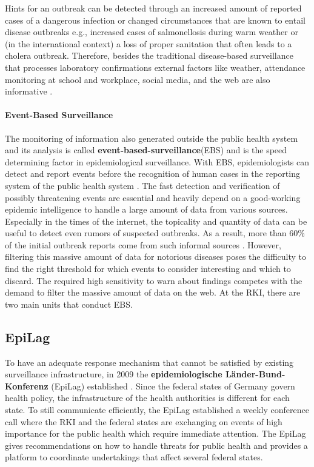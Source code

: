 Hints for an outbreak can be detected through an increased amount of reported cases of a dangerous infection or changed circumstances that are known to entail disease outbreaks e.g., increased cases of salmonellosis during warm weather or (in the international context) a loss of proper sanitation that often leads to a cholera outbreak.
Therefore, besides the traditional disease-based surveillance that processes laboratory confirmations external factors like weather, attendance monitoring at school and workplace, social media, and the web are also informative \citep{EarlyDetection}.

\paragraph{Event-Based Surveillance}
The monitoring of information also generated outside the public health system and its analysis is called \textbf{event-based-surveillance}(\gls{EBS}) and is the speed determining factor in epidemiological surveillance.
With EBS, epidemiologists can detect and report events before the recognition of human cases in the reporting system of the public health system \citep{EarlyDetection}.
The fast detection and verification of possibly threatening events are essential and heavily depend on a good-working epidemic intelligence to handle a large amount of data from various sources.
Especially in the times of the internet, the topicality and quantity of data can be useful to detect even rumors of suspected outbreaks.
As a result, more than 60\% of the initial outbreak reports come from such informal sources \citep{EpiSurv}.
However, filtering this massive amount of data for notorious diseases poses the difficulty to find the right threshold for which events to consider interesting and which to discard.
The required high sensitivity to warn about findings competes with the demand to filter the massive amount of data on the web.
At the RKI, there are two main units that conduct EBS.

\subsection{EpiLag}
To have an adequate response mechanism that cannot be satisfied by existing surveillance infrastructure, in 2009 the \textbf{epidemiologische L\"ander-Bund-Konferenz} (\gls{EpiLag})  established \citep{Mohr2010}.
Since the federal states of Germany govern health policy, the infrastructure of the health authorities is different for each state.
To still communicate efficiently, the EpiLag established a weekly conference call where the RKI and the federal states are exchanging on events of high importance for the public health which require immediate attention.
The EpiLag gives recommendations on how to handle threats for public health and provides a platform to coordinate undertakings that affect several federal states.

